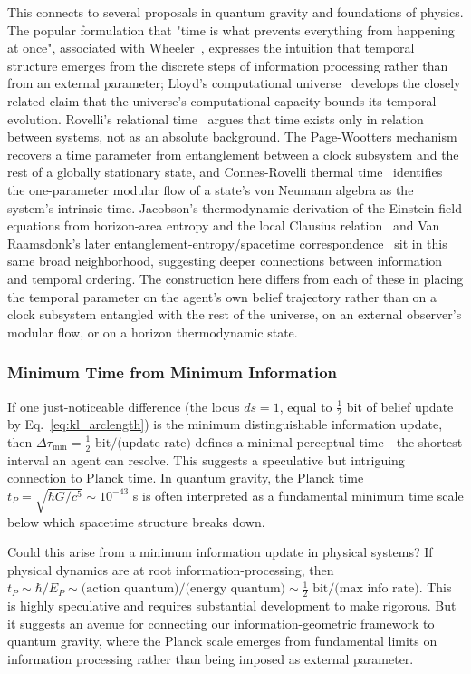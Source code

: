 \documentclass[11pt]{article}
\begin{document}
This connects to several proposals in quantum gravity and foundations of physics. The popular formulation that "time is what prevents everything from happening at once", associated with Wheeler~\cite{Wheeler1990}, expresses the intuition that temporal structure emerges from the discrete steps of information processing rather than from an external parameter; Lloyd's computational universe~\cite{Lloyd2002} develops the closely related claim that the universe's computational capacity bounds its temporal evolution. Rovelli's relational time~\cite{Rovelli2004} argues that time exists only in relation between systems, not as an absolute background. The Page-Wootters mechanism~\cite{PageWootters1983} recovers a time parameter from entanglement between a clock subsystem and the rest of a globally stationary state, and Connes-Rovelli thermal time~\cite{ConnesRovelli1994} identifies the one-parameter modular flow of a state's von Neumann algebra as the system's intrinsic time. Jacobson's thermodynamic derivation of the Einstein field equations from horizon-area entropy and the local Clausius relation~\cite{Jacobson1995} and Van Raamsdonk's later entanglement-entropy/spacetime correspondence~\cite{VanRaamsdonk2010} sit in this same broad neighborhood, suggesting deeper connections between information and temporal ordering. The construction here differs from each of these in placing the temporal parameter on the agent's own belief trajectory rather than on a clock subsystem entangled with the rest of the universe, on an external observer's modular flow, or on a horizon thermodynamic state.

\subsubsection{Minimum Time from Minimum Information}

If one just-noticeable difference (the locus $ds = 1$, equal to $\tfrac{1}{2}$ bit of belief update by Eq.~\eqref{eq:kl_arclength}) is the minimum distinguishable information update, then $\Delta \tau_{\min} = \tfrac{1}{2} \text{ bit} / \text{(update rate)}$ defines a minimal perceptual time - the shortest interval an agent can resolve. This suggests a speculative but intriguing connection to Planck time. In quantum gravity, the Planck time $t_P = \sqrt{\hbar G/c^5} \sim 10^{-43}$ s is often interpreted as a fundamental minimum time scale below which spacetime structure breaks down.

Could this arise from a minimum information update in physical systems? If physical dynamics are at root information-processing, then $t_P \sim \hbar/E_P \sim \text{(action quantum)}/\text{(energy quantum)} \sim \tfrac{1}{2} \text{ bit}/\text{(max info rate)}$. This is highly speculative and requires substantial development to make rigorous. But it suggests an avenue for connecting our information-geometric framework to quantum gravity, where the Planck scale emerges from fundamental limits on information processing rather than being imposed as external parameter.
\end{document}
